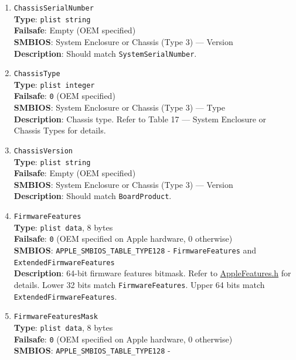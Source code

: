 \documentclass[]{article}
\begin{document}
\begin{enumerate}
  \texttt{SystemManufacturer} do apply.
\item
  \texttt{ChassisSerialNumber}\\
  \textbf{Type}: \texttt{plist\ string}\\
  \textbf{Failsafe}: Empty (OEM specified)\\
  \textbf{SMBIOS}: System Enclosure or Chassis (Type 3) --- Version\\
  \textbf{Description}: Should match \texttt{SystemSerialNumber}.
\item
  \texttt{ChassisType}\\
  \textbf{Type}: \texttt{plist\ integer}\\
  \textbf{Failsafe}: \texttt{0} (OEM specified)\\
  \textbf{SMBIOS}: System Enclosure or Chassis (Type 3) --- Type\\
  \textbf{Description}: Chassis type. Refer to Table 17 --- System
  Enclosure or Chassis Types for details.
\item
  \texttt{ChassisVersion}\\
  \textbf{Type}: \texttt{plist\ string}\\
  \textbf{Failsafe}: Empty (OEM specified)\\
  \textbf{SMBIOS}: System Enclosure or Chassis (Type 3) --- Version\\
  \textbf{Description}: Should match \texttt{BoardProduct}.
\item
  \texttt{FirmwareFeatures}\\
  \textbf{Type}: \texttt{plist\ data}, 8 bytes\\
  \textbf{Failsafe}: \texttt{0} (OEM specified on Apple hardware, 0 otherwise)\\
  \textbf{SMBIOS}: \texttt{APPLE\_SMBIOS\_TABLE\_TYPE128} -
  \texttt{FirmwareFeatures} and \texttt{ExtendedFirmwareFeatures}\\
  \textbf{Description}: 64-bit firmware features bitmask. Refer to
  \href{https://github.com/acidanthera/MaxRegnerPkg/blob/master/Include/Apple/IndustryStandard/AppleFeatures.h}{AppleFeatures.h}
  for details. Lower 32 bits match \texttt{FirmwareFeatures}. Upper
  64 bits match \texttt{ExtendedFirmwareFeatures}.
\item
  \texttt{FirmwareFeaturesMask}\\
  \textbf{Type}: \texttt{plist\ data}, 8 bytes\\
  \textbf{Failsafe}: \texttt{0} (OEM specified on Apple hardware, 0 otherwise)\\
  \textbf{SMBIOS}: \texttt{APPLE\_SMBIOS\_TABLE\_TYPE128} -

\end{enumerate}
\end{document}
